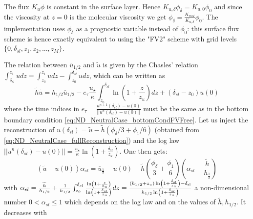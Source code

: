 \begin{remark}
	The flux $K_u \phi$ is constant in the surface layer. Hence
	$K_{u,\delta}\phi_{\delta} = K_{u,0} \phi_0$ and since the
	viscosity at $z=0$ is the molecular viscosity we get
	$\phi_{\delta} = \frac{K_{mol}}{K_{u,\delta}} \phi_0$.
	The implementation uses $\phi_{\delta}$ as a prognostic
	variable instead of $\phi_0$:
	this surface flux scheme is hence exactly equivalent
	to using the "FV2" scheme with grid levels
	$\{0, \delta_{sl}, z_1, z_2, ..., z_M\}$.
\end{remark}
\par
The relation between $\overline{u}_{1/2}$ and $\widetilde{u}$ is 
given by the Chasles' relation
$ \int_{\delta_{sl}}^{z_1} u dz = \int_{z_0}^{z_1} u dz -
\int_{z_0}^{\delta_{sl}} u dz$, which can be written as
\begin{equation}
\label{eq:ND_NeutralCase_Chasles}
	\widetilde{h}\widetilde{u} = h_{1/2}\overline{u}_{1/2} -
	e_\tau \frac{{u_\star}}{\kappa}\int_{z_0}^{\delta_{sl}}
	\ln(1+\frac{z}{z_{u}}) dz
	+ (\delta_{sl}-z_0) u(0)
\end{equation}
where the time indices in $e_\tau = \frac{u^{n+1}(\delta_{sl})-u(0)}
{||u^n(\delta_{sl})-u(0)||}$ must be the same as in the
bottom boundary condition
\eqref{eq:ND_NeutralCase_bottomCondFVFree}.
Let us inject the reconstruction of
$u(\delta_{sl}) = \widetilde{u} - \widetilde{h}(\phi_{\delta}/3 + \phi_1/6)$
(obtained from \eqref{eq:ND_NeutralCase_fullReconstruction})
and the log law $||u^n(\delta_{sl})-u(0)|| = \frac{{u_\star}}{\kappa}\ln(1+\frac{\delta_{sl}}{z_{u}})$. One then gets:
\begin{equation}
	\label{eq:ND_NeutralCase_utildeExpression}
	\left(\widetilde{u} - u(0)\right) \alpha_{sl} =
	\overline{u}_{\frac{1}{2}} - u(0) - \widetilde{h}\left(
	\frac{\phi_\delta}{3} + \frac{\phi_1}{6} \right)
	\left(\alpha_{sl} - \frac{\widetilde{h}}{h_{\frac{1}{2}}}\right)
\end{equation}
with $\alpha_{sl} =
\frac{\widetilde{h}}{{h_{1/2}}} + \frac{1}{{h_{1/2}}}\int_{z_0}^{\delta_{sl}}
\frac{\ln(1+\frac{z}{z_{u}})}{\ln(1+\frac{\delta_{sl}}{z_{u}})}dz
= \frac{(h_{1/2} + z_{u})
\ln(1+\frac{\delta_{\rm sl}}{z_{u}}) - \delta_{\rm sl}}{
	h_{1/2}\ln(1+\frac{\delta_{sl}}{z_{u}})}$ a non-dimensional
number $0 < \alpha_{sl} \leq 1$ which depends on the log law and
on the values of $\widetilde{h}, h_{1/2}$. It decreases with
